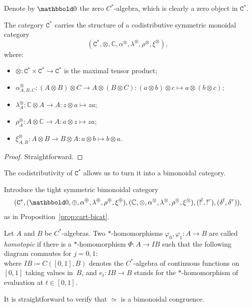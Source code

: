 \documentclass[10pt]{simplearticle}
\newcommand{\tikzinput}[1]{}
\newcommand{\Cstar}{\mathtt{C^{*}}}
\newcommand{\au}{\alpha^{\oplus}}
\newcommand{\lu}{\lambda^{\oplus}}
\newcommand{\ru}{\rho^{\oplus}}
\newcommand{\bbzero}{\mathbbold0}
\newcommand{\terminal}{\operatorname{!}}
\begin{document}
Denote by $\bbzero$ the zero $C^{*}$-algebra, which is clearly a
zero
object in $\Cstar$.
\begin{prop}\label{prop:cstar-mult-str}
The
category $\Cstar$
carries the structure of a codistributive symmetric monoidal category
\[
(\Cstar,\otimes,\mathbb{C},\alpha^{\otimes},\lambda^{\otimes},\rho^{\otimes},\xi^{\otimes}),
\]
 where:
\begin{itemize}
\item $\otimes\colon\Cstar\times\Cstar\to\Cstar$\textup{ is the maximal
tensor product;}
\item $\alpha^{\otimes}_{A,B,C}\colon(A\otimes B)\otimes C\to A\otimes(B\otimes C)\colon(a\otimes b)\otimes c\mapsto a\otimes(b\otimes c)$;
\item $\lambda^{\otimes}_{A}\colon\mathbb{C}\otimes A\to A\colon z\otimes a\mapsto za$;
\item $\rho^{\otimes}_{A}\colon A\otimes\mathbb{C}\to A\colon a\otimes z\mapsto za$;
\item $\xi^{\otimes}_{A,B}\colon A\otimes B\to B\otimes A\colon a\otimes b\mapsto b\otimes a$.
\end{itemize}
\end{prop}

\begin{proof}
Straightforward.
\end{proof}

The codistributivity of $\Cstar$ allows us to turn it into a bimonoidal
category.
\begin{defn}
Introduce the tight symmetric bimonoidal category
\begin{alignat}{1}
(\Cstar,(\bbzero,\oplus,\au,\lu,\ru,\xi^{\oplus}),(\mathbb{C},\otimes,\alpha^{\otimes},\lambda^{\otimes},\rho^{\otimes},\xi^{\otimes}),(\terminal^{l},\terminal^{r}),(\delta^{l},\delta^{r})),\label{eq:bimon-Cstar}
\end{alignat}
 as in Proposition~\ref{prop:cart-bicat}.
\end{defn}

\begin{defn}
Let $A$ and $B$ be $C^{*}$-algebras. Two $*$-homomorphisms $\varphi_{0},\varphi_{1}\colon A\to B$
are called \emph{homotopic} if there is a $*$-homomorphism $\Phi\colon A\to IB$
such that the following diagram commutes for $j=0,1$:
\[
\tikzinput{d472}
\]
where $IB\coloneqq C([0,1],B)$ denotes
the $C^{*}$-algebra
of continuous functions on $[0,1]$ taking values in~$B$, and $e_{t}\colon IB\to B$
stands for the $*$-homomorphism of evaluation at $t\in[0,1]$.

It is straightforward to verify that $\simeq$ is a bimonoidal congruence.
\end{defn}
\end{document}
